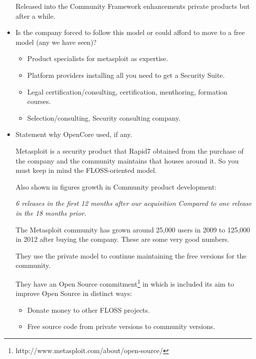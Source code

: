 \documentclass[11pt]{scrartcl}
\begin{document}
\begin{itemize}
Released into the Community Framework enhancements private products but after a while.

\item Is the company forced to follow this model or could afford to move to a free model (any we have seen)?

\begin{itemize}
    \item Product specialists for metasploit as expertise.
    \item Platform providers installing all you need to get a Security Suite.
    \item Legal certification/consulting, certification, menthoring, formation courses.
    \item Selection/consulting, Security consulting company.
\end{itemize}

\item Statement why OpenCore used, if any.

\par Metasploit is a security product that Rapid7 obtained from the purchase of the company and the community maintains that houses around it. So you must keep in mind the FLOSS-oriented model.

\par Also shown in figures growth in Community product development:

\emph{6 releases in the first 12 months after our acquisition Compared to one release in the 18 months prior.}

\par The Metasploit community has grown around 25,000 users in 2009 to 125,000 in 2012 after buying the company. These are some very good numbers.

\par They use the private model to continue maintaining the free versions for the community.

\par They have an Open Source commitment\footnote{http://www.metasploit.com/about/open-source/} in which is included its aim to improve Open Source in distinct ways:

    \begin{itemize}
        \item Donate money to other FLOSS projects.
        \item Free source code from private versions to community versions.
    \end{itemize}


\end{itemize}
\end{document}
